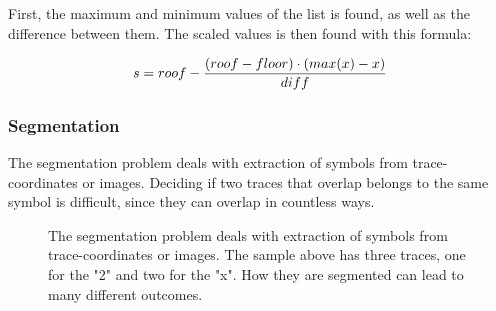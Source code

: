First, the maximum and minimum values of the list is found, as well as the difference between them. The scaled values is then found with this formula:

\begin{equation} \label{eqn:scale_linear_by_column}
\centering
\begin{split}
    s = roof - \frac{(roof - floor) \cdot (max(x) - x)}{diff}
\end{split}
\end{equation}


\label{scale_linear_by_column}

\subsubsection{Segmentation} \label{Segmentation}

The segmentation problem deals with extraction of symbols from trace-coordinates or images. Deciding if two traces that overlap belongs to the same symbol is difficult, since they can overlap in countless ways. 

\begin{figure}[H]
\centering
{}
\caption{The segmentation problem deals with extraction of symbols from trace-coordinates or images. The sample above has three traces, one for the "2"  and two for the "x". How they are segmented can lead to many different outcomes.}
\label{fig:segmentation_1}
\end{figure}

